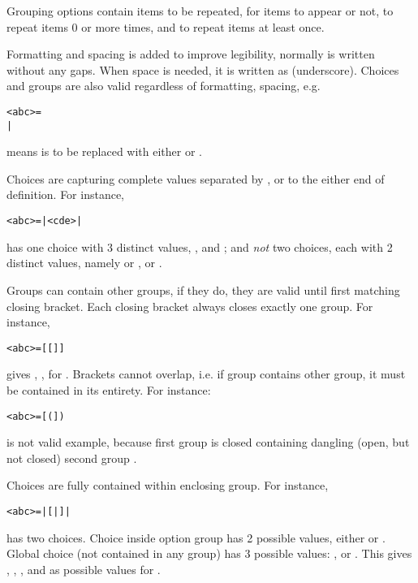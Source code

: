 Grouping options contain items to be repeated, \algfmt{[ ]} for items to appear
or not, \algfmt{( )} to repeat items 0 or more times, and \algfmt{\{ \}} to repeat
items at least once.

Formatting and spacing is added to improve legibility, normally  is
written without any gaps. When space is needed, it is written as \alg{\_}
(underscore). Choices and groups are also valid regardless of formatting,
spacing, e.g.
\begin{alltt}
<abc> = 
  | 
\end{alltt}
means  is to be replaced with either  or .

Choices are capturing complete values separated by \algfmt{|}, or to the either
end of definition. For instance,
\begin{alltt}
<abc> =  |  <cde>  | 
\end{alltt}
has one choice with 3 distinct values, ,  and
; and \emph{not} two choices, each with 2 distinct values, namely  or
,  or .

Groups can contain other groups, if they do, they are valid until first matching
closing bracket. Each closing bracket always closes exactly one group. For instance,
\begin{alltt}
<abc> =  [  [  ]  ] 
\end{alltt}
gives , ,  for .
Brackets cannot overlap, i.e. if group contains other group, it must be contained in
its entirety. For instance:
\begin{alltt}
<abc> =  [  (  ]  ) 
\end{alltt}
is not valid example, because first group \algfmt{[ ]} is closed containing
dangling (open, but not closed) second group \algfmt{( )}.

\clearpage %

Choices are fully contained within enclosing group. For instance,
\begin{alltt}
<abc> =  |  [  |  ]  | 
\end{alltt}
has two choices. Choice inside option group \algfmt{[ ]} has 2 possible values,
either  or . Global choice (not contained in any group) has 3 possible
values: , \algfmt{[}\algfmt{|}\algfmt{]} or .
This gives , , ,  and  as possible values for
.

